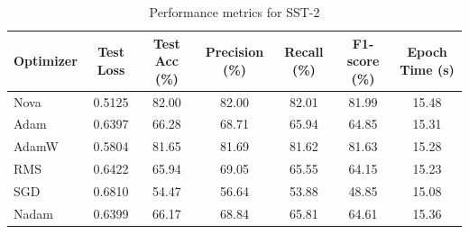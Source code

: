 \documentclass{article}
\begin{document}


\begin{table}[H]
\centering
\caption{Performance metrics for SST-2}
\begin{tabular}{lcccccc}\toprule
Optimizer & Test Loss & Test Acc (\%) & Precision (\%) & Recall (\%) & F1-score (\%) & Epoch Time (s) \\ \midrule
Nova & 0.5125 & 82.00 & 82.00 & 82.01 & 81.99 & 15.48 \\
Adam & 0.6397 & 66.28 & 68.71 & 65.94 & 64.85 & 15.31 \\
AdamW & 0.5804 & 81.65 & 81.69 & 81.62 & 81.63 & 15.28 \\
RMS & 0.6422 & 65.94 & 69.05 & 65.55 & 64.15 & 15.23 \\
SGD & 0.6810 & 54.47 & 56.64 & 53.88 & 48.85 & 15.08 \\
Nadam & 0.6399 & 66.17 & 68.84 & 65.81 & 64.61 & 15.36 \\
\bottomrule
\end{tabular}
\label{tab:sst-2_main}
\end{table}
\end{document}
